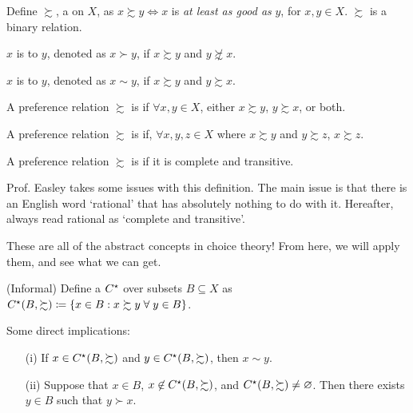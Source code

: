 \documentclass[12pt]{article}
\begin{document}
\begin{definition}
	Define $\succsim$, a  on $X$, as $x \succsim y \Longleftrightarrow x$ is \emph{at least as good as} $y$, for $x,y \in X$. $\succsim$ is a binary relation.
\end{definition}

\begin{definition}
	$x$ is  to $y$, denoted as $x \succ y$, if $x \succsim y$ and $y \not\succsim x$.
\end{definition}
\begin{definition}
	$x$ is  to $y$, denoted as $x \sim y$, if $x \succsim y$ and $y \succsim x$.
\end{definition}

\begin{definition}
	A preference relation $\succsim$ is  if $\forall x,y \in X$, either $x\succsim y$, $y \succsim x$, or both.
\end{definition}
\begin{definition}
	A preference relation $\succsim$ is  if, $\forall x,y,z \in X$ where $x \succsim y$ and $y \succsim z$, $x \succsim z$.
\end{definition}
\begin{definition}
	A preference relation $\succsim$ is  if it is complete and transitive.
\end{definition}
\begin{remark}
	Prof. Easley takes some issues with this definition. The main issue is that there is an English word `rational' that has absolutely nothing to do with it. Hereafter, always read rational as `complete and transitive'.
\end{remark}

\begin{remark}
	These are all of the abstract concepts in choice theory! From here, we will apply them, and see what we can get. 
\end{remark}

\begin{definition}
	(Informal) Define a  $C^\star$ over subsets $B \subseteq X$ as $C\opt(B,\succsim) \coloneqq \{x \in B : x \succsim y \forall y \in B\}$.
\end{definition}
\begin{remark}
	Some direct implications:
	\begin{itemize}
		\item[(i)] If $x \in C^\star(B,\succsim)$ and $y \in C^\star(B,\succsim)$, then $x \sim y$.
		
		\item[(ii)] Suppose that $x \in B$, $x \not\in C^\star(B,\succsim)$, and $C^\star(B,\succsim) \ne \mathop{\varnothing}$. Then there exists $y \in B$ such that $y \succ x$. 
	\end{itemize}
\end{remark}
\end{document}
